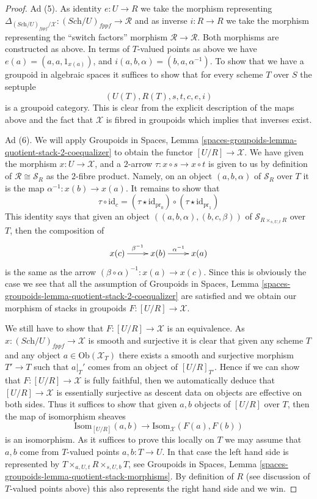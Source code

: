 \begin{proof}
\medskip\noindent
Ad (5). As identity $e : U \to R$ we take the morphism representing
$\Delta_{(\textit{Sch}/U)_{fppf}/\mathcal{X}} : (\textit{Sch}/U)_{fppf}
\to \mathcal{R}$ and as inverse $i : R \to R$ we take the morphism
representing the ``switch factors'' morphism
$\mathcal{R} \to \mathcal{R}$. Both morphisms are constructed as above.
In terms of $T$-valued points as above we have
$e(a) = (a, a, 1_{x(a)})$, and $i(a, b, \alpha) = (b, a, \alpha^{-1})$.
To show that we have a groupoid in algebraic spaces it suffices to show
that for every scheme $T$ over $S$ the septuple
$$
(U(T), R(T), s, t, c, e, i)
$$
is a groupoid category. This is clear from the explicit description
of the maps above and the fact that $\mathcal{X}$ is fibred in groupoids
which implies that inverses exist.

\medskip\noindent
Ad (6). We will apply
Groupoids in Spaces,
Lemma \ref{spaces-groupoids-lemma-quotient-stack-2-coequalizer}
to obtain the functor $[U/R] \to \mathcal{X}$.
We have given the morphism $x : U \to \mathcal{X}$,
and a $2$-arrow $\tau : x \circ s \to x \circ t$ is
given to us by definition of $\mathcal{R} \cong \mathcal{S}_R$
as the $2$-fibre product. Namely, on an object $(a, b, \alpha)$ of
$\mathcal{S}_R$ over $T$ it is the map $\alpha^{-1} : x(b) \to x(a)$.
It remains to show that
$$
\tau \circ \text{id}_c = 
(\tau \star \text{id}_{\text{pr}_0})
\circ
(\tau \star \text{id}_{\text{pr}_1})
$$
This identity says that given an object
$((a, b, \alpha), (b, c, \beta))$ of $\mathcal{S}_{R \times_{s, U, t} R}$
over $T$, then the composition of
$$
\xymatrix{
x(c) \ar[r]^{\beta^{-1}} & x(b) \ar[r]^{\alpha^{-1}} & x(a)
}
$$
is the same as the arrow $(\beta \circ \alpha)^{-1} : x(a) \to x(c)$. Since
this is obviously the case we see that all the assumption of
Groupoids in Spaces,
Lemma \ref{spaces-groupoids-lemma-quotient-stack-2-coequalizer}
are satisfied and we obtain our morphism of stacks in groupoids
$F : [U/R] \to \mathcal{X}$.

\medskip\noindent
We still have to show that $F : [U/R] \to \mathcal{X}$ is an equivalence.
As $x : (\textit{Sch}/U)_{fppf} \to \mathcal{X}$ is smooth and
surjective it is clear that given any scheme $T$ and any object
$a \in \text{Ob}(\mathcal{X}_T)$ there exists a smooth and surjective
morphism $T' \to T$ such that $a|_T'$ comes from an object of
$[U/R]_{T'}$. Hence if we can show that $F : [U/R] \to \mathcal{X}$
is fully faithful, then we automatically deduce that
$[U/R] \to \mathcal{X}$ is essentially surjective as
descent data on objects are effective on both sides.
Thus it suffices to show that given $a, b$ objects of $[U/R]$
over $T$, then the map of isomorphism sheaves
$$
\text{Isom}_{[U/R]}(a, b) \to \text{Isom}_{\mathcal{X}}(F(a), F(b))
$$
is an isomorphism. As it suffices to prove this locally on $T$
we may assume that $a, b$ come from $T$-valued points $a, b : T \to U$.
In that case the left hand side is represented by
$T \times_{a, U, t} R \times_{s, U, b} T$, see
Groupoids in Spaces,
Lemma \ref{spaces-groupoids-lemma-quotient-stack-morphisms}.
By definition of $R$ (see discussion of $T$-valued points above)
this also represents the right hand side and we win.
\end{proof}











